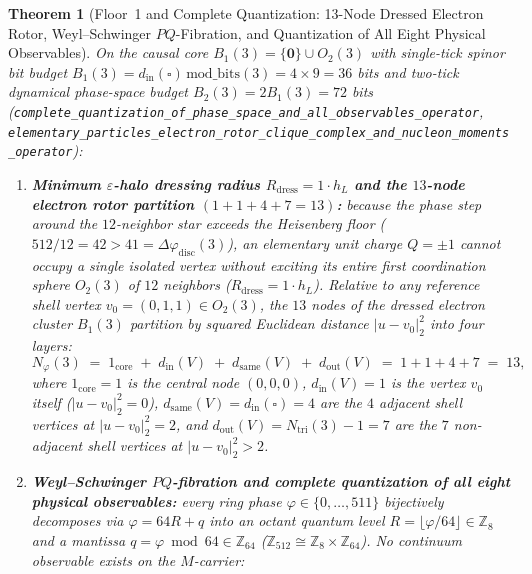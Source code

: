 \documentclass[11pt,a4paper]{article}
\theoremstyle{plain}
\newtheorem{theorem}{Theorem}[section]
\theoremstyle{definition}
\begin{document}
\begin{theorem}[Floor~1 and Complete Quantization: 13-Node Dressed Electron Rotor, Weyl--Schwinger $PQ$-Fibration, and Quantization of All Eight Physical Observables]
\label{thm:electron-rotor-complete-quantization}
On the causal core $B_1(3) = \{\mathbf{0}\}\cup O_2(3)$ with single-tick spinor bit budget $B_1(3) = d_{\mathrm{in}}(\square)\,\mathrm{mod\_bits}(3) = 4\times 9 = 36$ bits and two-tick dynamical phase-space budget $B_2(3) = 2 B_1(3) = 72$ bits (\texttt{complete\_quantization\_of\_phase\_space\_and\_all\_observables\_operator}, \texttt{elementary\_particles\_electron\_rotor\_clique\_complex\_and\_nucleon\_moments\_operator}):
\begin{enumerate}[label=\textbf{(\arabic*)},leftmargin=*]
\item \textbf{Minimum $\varepsilon$-halo dressing radius $R_{\mathrm{dress}} = 1\cdot h_L$ and the $13$-node electron rotor partition $(1 + 1 + 4 + 7 = 13)$:}
  because the phase step around the $12$-neighbor star exceeds the Heisenberg floor ($512/12 = 42 > 41 = \Delta\varphi_{\mathrm{disc}}(3)$), an elementary unit charge $Q = \pm 1$ cannot occupy a single isolated vertex without exciting its entire first coordination sphere $O_2(3)$ of $12$ neighbors ($R_{\mathrm{dress}} = 1\cdot h_L$). Relative to any reference shell vertex $v_0 = (0, 1, 1) \in O_2(3)$, the $13$ nodes of the dressed electron cluster $B_1(3)$ partition by squared Euclidean distance $|u - v_0|_2^2$ into four layers:
  \begin{equation}
    \label{eq:electron-13-partition}
    N_\varphi(3) \;=\; 1_{\mathrm{core}} \;+\; d_{\mathrm{in}}(V) \;+\; d_{\mathrm{same}}(V) \;+\; d_{\mathrm{out}}(V) \;=\; 1 + 1 + 4 + 7 \;=\; 13,
  \end{equation}
  where $1_{\mathrm{core}} = 1$ is the central node $(0,0,0)$, $d_{\mathrm{in}}(V) = 1$ is the vertex $v_0$ itself ($|u - v_0|_2^2 = 0$), $d_{\mathrm{same}}(V) = d_{\mathrm{in}}(\square) = 4$ are the $4$ adjacent shell vertices at $|u - v_0|_2^2 = 2$, and $d_{\mathrm{out}}(V) = N_{\mathrm{tri}}(3) - 1 = 7$ are the $7$ non-adjacent shell vertices at $|u - v_0|_2^2 > 2$.
\item \textbf{Weyl--Schwinger $PQ$-fibration and complete quantization of all eight physical observables:}
  every ring phase $\varphi \in \{0, \dots, 511\}$ bijectively decomposes via $\varphi = 64 R + q$ into an octant quantum level $R = \lfloor\varphi / 64\rfloor \in \mathbb{Z}_8$ and a mantissa $q = \varphi \bmod 64 \in \mathbb{Z}_{64}$ ($\mathbb{Z}_{512} \cong \mathbb{Z}_8 \times \mathbb{Z}_{64}$). No continuum observable exists on the $M$-carrier:

\end{enumerate}
\end{theorem}
\end{document}
